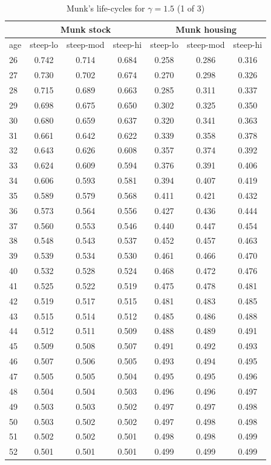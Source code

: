 \documentclass[]{elsarticle}
\begin{document}
\begin{appendix}
\begin{table}[H]
	\centering
	\caption[]{Munk's life-cycles for $\gamma = 1.5$ (1 of 3)}
	\begin{tabular}[c]{lcccccc}
&\multicolumn{3}{c}{Munk stock}&\multicolumn{3}{c}{Munk housing}\\
		\hline
age&steep-lo&steep-mod&steep-hi&steep-lo&steep-mod&steep-hi\\
		\hline
26&0.742&0.714&0.684&0.258&0.286&0.316\\
27&0.730&0.702&0.674&0.270&0.298&0.326\\
28&0.715&0.689&0.663&0.285&0.311&0.337\\
29&0.698&0.675&0.650&0.302&0.325&0.350\\
30&0.680&0.659&0.637&0.320&0.341&0.363\\
31&0.661&0.642&0.622&0.339&0.358&0.378\\
32&0.643&0.626&0.608&0.357&0.374&0.392\\
33&0.624&0.609&0.594&0.376&0.391&0.406\\
34&0.606&0.593&0.581&0.394&0.407&0.419\\
35&0.589&0.579&0.568&0.411&0.421&0.432\\
36&0.573&0.564&0.556&0.427&0.436&0.444\\
37&0.560&0.553&0.546&0.440&0.447&0.454\\
38&0.548&0.543&0.537&0.452&0.457&0.463\\
39&0.539&0.534&0.530&0.461&0.466&0.470\\
40&0.532&0.528&0.524&0.468&0.472&0.476\\
41&0.525&0.522&0.519&0.475&0.478&0.481\\
42&0.519&0.517&0.515&0.481&0.483&0.485\\
43&0.515&0.514&0.512&0.485&0.486&0.488\\
44&0.512&0.511&0.509&0.488&0.489&0.491\\
45&0.509&0.508&0.507&0.491&0.492&0.493\\
46&0.507&0.506&0.505&0.493&0.494&0.495\\
47&0.505&0.505&0.504&0.495&0.495&0.496\\
48&0.504&0.504&0.503&0.496&0.496&0.497\\
49&0.503&0.503&0.502&0.497&0.497&0.498\\
50&0.503&0.502&0.502&0.497&0.498&0.498\\
51&0.502&0.502&0.501&0.498&0.498&0.499\\
52&0.501&0.501&0.501&0.499&0.499&0.499\\

\end{tabular}
\end{table}
\end{appendix}
\end{document}
